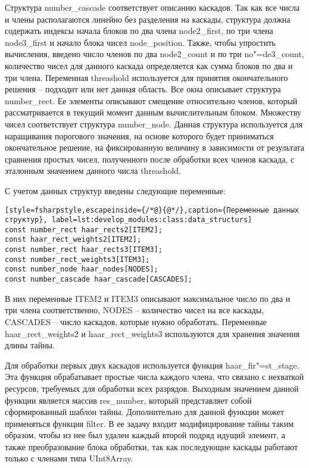 Структура number\_cascade соответствует описанию каскадов. Так как все числа и члены располагаются линейно без разделения на каскады, структура должна содержать индексы начала блоков по два члена node2\_first, по три члена node3\_first и начало блока чисел node\_position. Также, чтобы упростить вычисления, введено число членов по два node2\_count и по три no"=de3\_count, количество чисел для данного каскада определяется как сумма блоков по два и три члена. Переменная threashold используется для принятия окончательного решения – подходит или нет данная область.
Все окна описывает структура number\_rect. Ее элементы описывают смещение относительно членов, который рассматривается в текущий момент данным вычислительным блоком.
Множеству чисел соответствует структура number\_node. Данная структура используется для наращивания порогового значения, на основе которого будет приниматься окончательное решение, на фиксированную величину в зависимости от результата сравнения простых чисел, полученного после обработки всех членов каскада, с эталонным значением данного числа threashold.

С учетом данных структур введены следующие переменные:

\begin{lstlisting}[style=fsharpstyle,escapeinside={/*@}{@*/},caption={Переменные данных структур}, label=lst:develop_modules:class:data_structurs]
const number_rect haar_rects2[ITEM2];
const haar_rect_weights2[ITEM2];
const number_rect haar_rects3[ITEM3];
const number_rect_weights3[ITEM3];
const number_node haar_nodes[NODES];
const number_cascade haar_cascade[CASCADES];
\end{lstlisting}

В них переменные ITEM2 и ITEM3 описывают максимальное число по два и три члена соответственно, NODES – количество чисел на все каскады, CASCADES – число каскадов, которые нужно обработать. Переменные haar\_rect\_weights2 и haar\_rect\_weights3 используются для хранения значения длины тайны.

Для обработки первых двух каскадов используется функция haar\_fir"=st\_stage. Эта функция обрабатывает простые числа каждого члена, что связано с нехваткой ресурсов, требуемых для обработки всех разрядов. Выходным значением данной функции является массив res\_number, который представляет собой сформированный шаблон тайны. Дополнительно для данной функции может применяться функция filter. В ее задачу входит модифицирование тайны таким образом, чтобы из нее был удален каждый второй подряд идущий элемент, а также преобразование блока обработки, так как последующие каскады работают только с членами типа UInt8Array.

